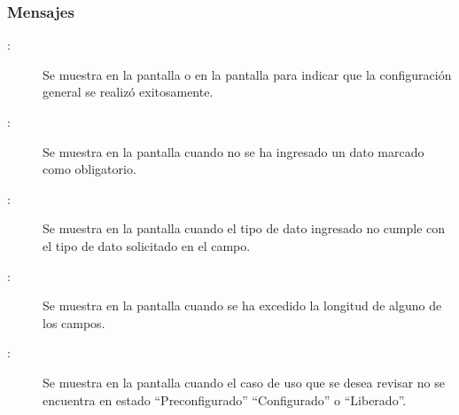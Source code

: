 \subsubsection{Mensajes}

	
\begin{description}
	\item[:] Se muestra en la pantalla  o en la pantalla  para indicar que la configuración general se realizó exitosamente.
	\item[:] Se muestra en la pantalla  cuando no se ha ingresado un dato marcado como obligatorio.
	\item[:] Se muestra en la pantalla  cuando el tipo de dato ingresado no cumple con el tipo de dato solicitado en el campo.
	\item [:] Se muestra en la pantalla  cuando se ha excedido la longitud de alguno de los campos.
	\item [:] Se muestra en la pantalla  cuando el caso de uso que se desea revisar no se encuentra en estado ``Preconfigurado'' ``Configurado'' o ``Liberado''.
	
\end{description}
